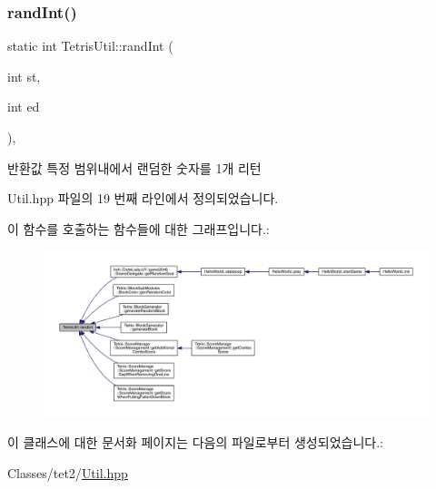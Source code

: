 \subsubsection{\texorpdfstring{rand\+Int()}{randInt()}}
{\footnotesize\ttfamily static int Tetris\+Util\+::rand\+Int (\begin{DoxyParamCaption}\item[{int}]{st,  }\item[{int}]{ed }\end{DoxyParamCaption})\hspace{0.3cm}{\ttfamily [inline]}, {\ttfamily [static]}}

\begin{DoxyReturn}{반환값}
특정 범위내에서 랜덤한 숫자를 1개 리턴 
\end{DoxyReturn}


Util.\+hpp 파일의 19 번째 라인에서 정의되었습니다.

이 함수를 호출하는 함수들에 대한 그래프입니다.\+:
\nopagebreak
\begin{figure}[H]
\begin{center}
\leavevmode
\includegraphics[width=350pt]{class_tetris_util_a0a60e809425ddb416a500bcc03cf7061_icgraph}
\end{center}
\end{figure}


이 클래스에 대한 문서화 페이지는 다음의 파일로부터 생성되었습니다.\+:\begin{DoxyCompactItemize}
\item 
Classes/tet2/\hyperlink{_util_8hpp}{Util.\+hpp}\end{DoxyCompactItemize}
